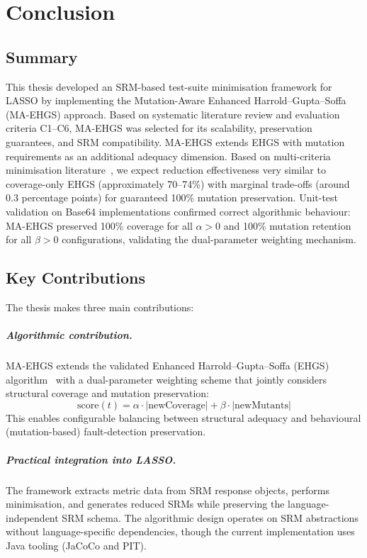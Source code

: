 \chapter{Conclusion}

\section{Summary}

This thesis developed an SRM-based test-suite minimisation framework for LASSO by implementing the Mutation-Aware Enhanced Harrold--Gupta--Soffa (MA-EHGS) approach. Based on systematic literature review and evaluation criteria C1--C6, MA-EHGS was selected for its scalability, preservation guarantees, and SRM compatibility. MA-EHGS extends EHGS with mutation requirements as an additional adequacy dimension. Based on multi-criteria minimisation literature~\cite{lin2018,shi2018}, we expect reduction effectiveness very similar to coverage-only EHGS (approximately 70--74\%) with marginal trade-offs (around 0.3 percentage points) for guaranteed 100\% mutation preservation. Unit-test validation on Base64 implementations confirmed correct algorithmic behaviour: MA-EHGS preserved 100\% coverage for all $\alpha>0$ and 100\% mutation retention for all $\beta>0$ configurations, validating the dual-parameter weighting mechanism.


\section{Key Contributions}

The thesis makes three main contributions:

\paragraph{Algorithmic contribution.}
MA-EHGS extends the validated Enhanced Harrold--Gupta--Soffa (EHGS) algorithm~\cite{gladston2015} with a dual-parameter weighting scheme that jointly considers structural coverage and mutation preservation:
\[
\text{score}(t) = \alpha \cdot |\text{newCoverage}| + \beta \cdot |\text{newMutants}|
\]
This enables configurable balancing between structural adequacy and behavioural (mutation-based) fault-detection preservation.

\paragraph{Practical integration into LASSO.}
The framework extracts metric data from SRM response objects, performs minimisation, and generates reduced SRMs while preserving the language-independent SRM schema. The algorithmic design operates on SRM abstractions without language-specific dependencies, though the current implementation uses Java tooling (JaCoCo and PIT).

